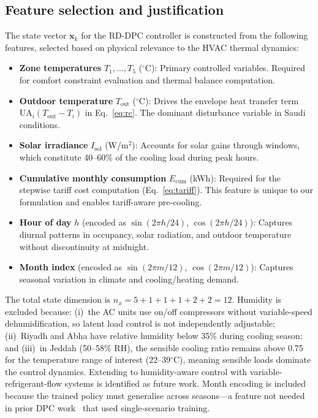 \documentclass[12pt]{article}
\theoremstyle{plain}
\theoremstyle{definition}
\begin{document}
\subsection{Feature selection and justification}\label{sec:features}

The state vector $\mathbf{x}_k$ for the RD-DPC controller is constructed from the following features, selected based on physical relevance to the HVAC thermal dynamics:
\begin{itemize}[leftmargin=*]
\item \textbf{Zone temperatures} $T_1, \ldots, T_5$ ($^\circ$C): Primary controlled variables. Required for comfort constraint evaluation and thermal balance computation.
\item \textbf{Outdoor temperature} $T_{\text{out}}$ ($^\circ$C): Drives the envelope heat transfer term $\text{UA}_i(T_{\text{out}} - T_i)$ in Eq.~\ref{eq:rc}. The dominant disturbance variable in Saudi conditions.
\item \textbf{Solar irradiance} $I_{\text{sol}}$ (W/m$^2$): Accounts for solar gains through windows, which constitute 40--60\% of the cooling load during peak hours.
\item \textbf{Cumulative monthly consumption} $E_{\text{cum}}$ (kWh): Required for the stepwise tariff cost computation (Eq.~\ref{eq:tariff}). This feature is unique to our formulation and enables tariff-aware pre-cooling.
\item \textbf{Hour of day} $h$ (encoded as $\sin(2\pi h/24)$, $\cos(2\pi h/24)$): Captures diurnal patterns in occupancy, solar radiation, and outdoor temperature without discontinuity at midnight.
\item \textbf{Month index} (encoded as $\sin(2\pi m/12)$, $\cos(2\pi m/12)$): Captures seasonal variation in climate and cooling/heating demand.
\end{itemize}
The total state dimension is $n_x = 5 + 1 + 1 + 1 + 2 + 2 = 12$. Humidity is excluded because: (i)~the AC units use on/off compressors without variable-speed dehumidification, so latent load control is not independently adjustable; (ii)~Riyadh and Abha have relative humidity below 35\% during cooling season; and (iii)~in Jeddah (50--58\% RH), the sensible cooling ratio remains above 0.75 for the temperature range of interest (22--39$^\circ$C), meaning sensible loads dominate the control dynamics. Extending to humidity-aware control with variable-refrigerant-flow systems is identified as future work. Month encoding is included because the trained policy must generalise across seasons---a feature not needed in prior DPC work~\cite{drgona2024dpc} that used single-scenario training.
\end{document}
